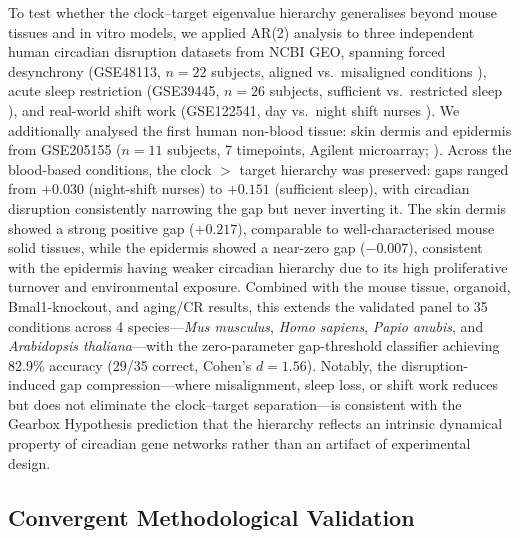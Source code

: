 \documentclass[11pt,a4paper]{article}
\begin{document}
To test whether the clock--target eigenvalue hierarchy generalises beyond mouse tissues and in vitro models, we applied AR(2) analysis to three independent human circadian disruption datasets from NCBI GEO, spanning forced desynchrony (GSE48113, $n=22$ subjects, aligned vs.\ misaligned conditions \citep{archer2014mistimed}), acute sleep restriction (GSE39445, $n=26$ subjects, sufficient vs.\ restricted sleep \citep{mollerlevet2013effects}), and real-world shift work (GSE122541, day vs.\ night shift nurses \citep{gamble2019shift}). We additionally analysed the first human non-blood tissue: skin dermis and epidermis from GSE205155 ($n=11$ subjects, 7 timepoints, Agilent microarray; \citep{wu2018population}). Across the blood-based conditions, the clock $>$ target hierarchy was preserved: gaps ranged from $+0.030$ (night-shift nurses) to $+0.151$ (sufficient sleep), with circadian disruption consistently narrowing the gap but never inverting it. The skin dermis showed a strong positive gap ($+0.217$), comparable to well-characterised mouse solid tissues, while the epidermis showed a near-zero gap ($-0.007$), consistent with the epidermis having weaker circadian hierarchy due to its high proliferative turnover and environmental exposure. Combined with the mouse tissue, organoid, Bmal1-knockout, and aging/CR results, this extends the validated panel to 35 conditions across 4 species---\textit{Mus musculus}, \textit{Homo sapiens}, \textit{Papio anubis}, and \textit{Arabidopsis thaliana}---with the zero-parameter gap-threshold classifier achieving 82.9\% accuracy (29/35 correct, Cohen's $d = 1.56$). Notably, the disruption-induced gap compression---where misalignment, sleep loss, or shift work reduces but does not eliminate the clock--target separation---is consistent with the Gearbox Hypothesis prediction that the hierarchy reflects an intrinsic dynamical property of circadian gene networks rather than an artifact of experimental design.

\subsection{Convergent Methodological Validation}
\end{document}
